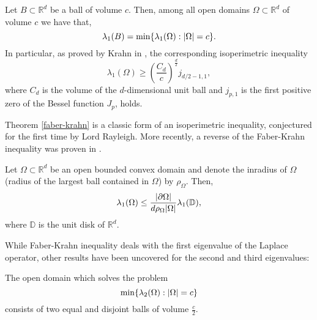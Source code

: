 \begin{theorem}\label{faber-krahn}
    Let \(B \subset \mathbb{R}^d\) be a ball of volume \(c\). Then, among all open domains \(\Omega \subset \mathbb{R}^d\) of volume \(c\) we have that,
    \[
    \lambda_1(B) = \min\{\lambda_1(\Omega): \abs{\Omega} = c\}.
    \]
    In particular, as proved by Krahn in \cite{krahn1926minimaleigenschaften}, the corresponding isoperimetric inequality
    \[
        \lambda_1(\Omega) \geq \left(\frac{C_d}{c}\right)^\frac{d}{2}j_{d/2-1, 1},
    \]
    where \(C_d\) is the volume of the \(d\)-dimensional unit ball and \(j_{p,1}\) is the first positive zero of the Bessel function \(J_p\), holds.
\end{theorem}

Theorem \ref{faber-krahn} is a classic form of an isoperimetric inequality, conjectured for the first time by Lord Rayleigh. More recently, a reverse of the Faber-Krahn inequality was proven in \cite{freitas2008sharp}.
\begin{theorem}\label{reverse_faber-krahn}
    Let \(\Omega \subset \mathbb{R}^d\) be an open bounded convex domain and denote the inradius of \(\Omega\) (radius of the largest ball contained in \(\Omega\)) by \(\rho_\Omega\). Then,
    \[
    \lambda_1(\Omega) \leq \frac{\abs{\partial \Omega}}{d \rho_\Omega \abs{\Omega}} \lambda_1(\mathbb{D}),
    \]
    where \(\mathbb{D}\) is the unit disk of \(\mathbb{R}^d\).
\end{theorem}

While Faber-Krahn inequality deals with the first eigenvalue of the Laplace operator, other results have been uncovered for the second and third eigenvalues:

\begin{theorem}\label{krahn_szego}
    The open domain which solves the problem
    \[
    \min\{\lambda_2(\Omega): \abs{\Omega} = c\}
    \]
    consists of two equal and disjoint balls of volume \(\frac{c}{2}\).
\end{theorem}

